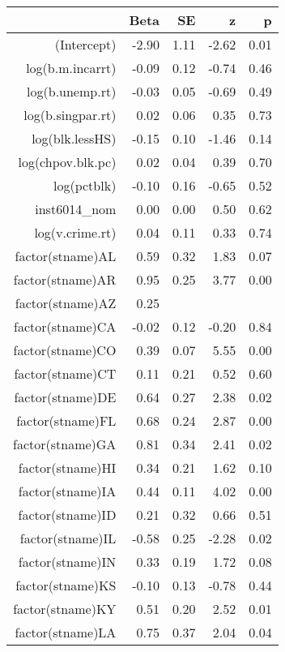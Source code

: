 \begin{table}[ht]
\centering
\begin{tabular}{rrrrr}
  \hline
 & Beta & SE & z & p \\ 
  \hline
(Intercept) & -2.90 & 1.11 & -2.62 & 0.01 \\ 
  log(b.m.incarrt) & -0.09 & 0.12 & -0.74 & 0.46 \\ 
  log(b.unemp.rt) & -0.03 & 0.05 & -0.69 & 0.49 \\ 
  log(b.singpar.rt) & 0.02 & 0.06 & 0.35 & 0.73 \\ 
  log(blk.lessHS) & -0.15 & 0.10 & -1.46 & 0.14 \\ 
  log(chpov.blk.pc) & 0.02 & 0.04 & 0.39 & 0.70 \\ 
  log(pctblk) & -0.10 & 0.16 & -0.65 & 0.52 \\ 
  inst6014\_nom & 0.00 & 0.00 & 0.50 & 0.62 \\ 
  log(v.crime.rt) & 0.04 & 0.11 & 0.33 & 0.74 \\ 
  factor(stname)AL & 0.59 & 0.32 & 1.83 & 0.07 \\ 
  factor(stname)AR & 0.95 & 0.25 & 3.77 & 0.00 \\ 
  factor(stname)AZ & 0.25 &  &  &  \\ 
  factor(stname)CA & -0.02 & 0.12 & -0.20 & 0.84 \\ 
  factor(stname)CO & 0.39 & 0.07 & 5.55 & 0.00 \\ 
  factor(stname)CT & 0.11 & 0.21 & 0.52 & 0.60 \\ 
  factor(stname)DE & 0.64 & 0.27 & 2.38 & 0.02 \\ 
  factor(stname)FL & 0.68 & 0.24 & 2.87 & 0.00 \\ 
  factor(stname)GA & 0.81 & 0.34 & 2.41 & 0.02 \\ 
  factor(stname)HI & 0.34 & 0.21 & 1.62 & 0.10 \\ 
  factor(stname)IA & 0.44 & 0.11 & 4.02 & 0.00 \\ 
  factor(stname)ID & 0.21 & 0.32 & 0.66 & 0.51 \\ 
  factor(stname)IL & -0.58 & 0.25 & -2.28 & 0.02 \\ 
  factor(stname)IN & 0.33 & 0.19 & 1.72 & 0.08 \\ 
  factor(stname)KS & -0.10 & 0.13 & -0.78 & 0.44 \\ 
  factor(stname)KY & 0.51 & 0.20 & 2.52 & 0.01 \\ 
  factor(stname)LA & 0.75 & 0.37 & 2.04 & 0.04 \\ 

\end{tabular}
\end{table}
